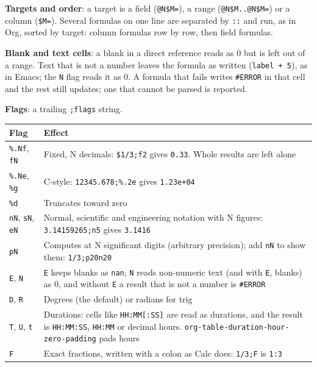 \documentclass[11pt]{article}
\begin{document}
\textbf{Targets and order}: a target is a field (\texttt{@N\$M=}), a range (\texttt{@N\$M..@N\$M=}) or a column (\texttt{\$M=}). Several formulas on one line are separated by \texttt{::} and run, as in Org, sorted by target: column formulas row by row, then field formulas.

\textbf{Blank and text cells}: a blank in a direct reference reads as 0 but is left out of a range. Text that is not a number leaves the formula as written (\texttt{label + 5}), as in Emacs; the \texttt{N} flag reads it as 0. A formula that fails writes \texttt{\#ERROR} in that cell and the rest still updates; one that cannot be parsed is reported.

\textbf{Flags}: a trailing \texttt{;flags} string.

\begin{center}
\begin{tabular}{ll}
Flag & Effect\\[0pt]
\hline
\texttt{\%.Nf}, \texttt{fN} & Fixed, N decimals: \texttt{\$1/3;f2} gives \texttt{0.33}. Whole results are left alone\\[0pt]
\texttt{\%.Ne}, \texttt{\%g} & C-style: \texttt{12345.678;\%.2e} gives \texttt{1.23e+04}\\[0pt]
\texttt{\%d} & Truncates toward zero\\[0pt]
\texttt{nN}, \texttt{sN}, \texttt{eN} & Normal, scientific and engineering notation with N figures: \texttt{3.14159265;n5} gives \texttt{3.1416}\\[0pt]
\texttt{pN} & Computes at N significant digits (arbitrary precision); add \texttt{nN} to show them: \texttt{1/3;p20n20}\\[0pt]
\texttt{E}, \texttt{N} & \texttt{E} keeps blanks as \texttt{nan}; \texttt{N} reads non-numeric text (and with \texttt{E}, blanks) as 0, and without \texttt{E} a result that is not a number is \texttt{\#ERROR}\\[0pt]
\texttt{D}, \texttt{R} & Degrees (the default) or radians for trig\\[0pt]
\texttt{T}, \texttt{U}, \texttt{t} & Durations: cells like \texttt{HH:MM[:SS]} are read as durations, and the result is \texttt{HH:MM:SS}, \texttt{HH:MM} or decimal hours. \texttt{org-table-duration-hour-zero-padding} pads hours\\[0pt]
\texttt{F} & Exact fractions, written with a colon as Calc does: \texttt{1/3;F} is \texttt{1:3}\\[0pt]
\end{tabular}
\end{center}
\end{document}
